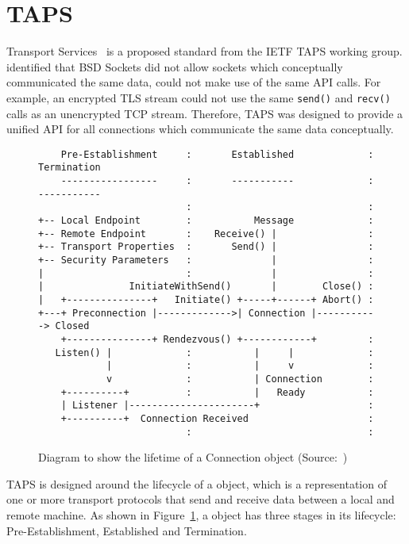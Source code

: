 \section{TAPS}\label{sec:taps}
Transport Services~\citep{pauly_architecturetransportservices_2020} is a proposed standard from the IETF TAPS working
group.
\citet{pauly_architecturetransportservices_2020} identified that BSD Sockets did not allow sockets which conceptually
communicated the same data, could not make use of the same API calls.
For example, an encrypted TLS stream could not use the same \texttt{send()} and \texttt{recv()} calls as an unencrypted
TCP stream.
Therefore, TAPS was designed to provide a unified API for all connections which communicate the same data conceptually.

\begin{figure}[h]
    \begin{verbatim}
    Pre-Establishment     :       Established             : Termination
    -----------------     :       -----------             : -----------
                          :                               :
+-- Local Endpoint        :           Message             :
+-- Remote Endpoint       :    Receive() |                :
+-- Transport Properties  :       Send() |                :
+-- Security Parameters   :              |                :
|                         :              |                :
|               InitiateWithSend()       |        Close() :
|   +---------------+   Initiate() +-----+------+ Abort() :
+---+ Preconnection |------------->| Connection |-----------> Closed
    +---------------+ Rendezvous() +------------+         :
   Listen() |             :           |     |             :
            |             :           |     v             :
            v             :           | Connection        :
    +----------+          :           |   Ready           :
    | Listener |----------------------+                   :
    +----------+  Connection Received                     :
                          :                               :
    \end{verbatim}
    \caption{Diagram to show the lifetime of a Connection object
            (Source:~\citet[fig:4]{pauly_architecturetransportservices_2020})}
    \label{fig:tapsConLife}
\end{figure}

TAPS is designed around the lifecycle of a \connection{} object, which is a representation of one or more transport
protocols that send and receive data between a local and remote machine.
As shown in Figure~\ref{fig:tapsConLife}, a \connection{} object has three stages in its lifecycle: Pre-Establishment,
Established and Termination.

